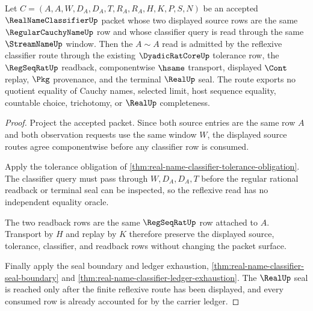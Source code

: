\begin{theorem}
\label{thm:realnameclassifier-reflexive-window}
Let $C=(A,A,W,D_A,D_A,T,R_A,R_A,H,K,P,S,N)$ be an accepted $\RealNameClassifierUp$ packet whose two displayed source rows are the same $\RegularCauchyNameUp$ row and whose classifier query is read through the same $\StreamNameUp$ window. Then the $A\sim A$ read is admitted by the reflexive classifier route through the existing $\DyadicRatCoreUp$ tolerance row, the $\RegSeqRatUp$ readback, componentwise $\hsame$ transport, displayed $\Cont$ replay, $\Pkg$ provenance, and the terminal $\RealUp$ seal. The route exports no quotient equality of Cauchy names, selected limit, host sequence equality, countable choice, trichotomy, or $\RealUp$ completeness.
\end{theorem}
\begin{proof}
Project the accepted packet. Since both source entries are the same row $A$ and both observation requests use the same window $W$, the displayed source routes agree componentwise before any classifier row is consumed.

Apply the tolerance obligation of \autoref{thm:real-name-classifier-tolerance-obligation}. The classifier query must pass through $W,D_A,D_A,T$ before the regular rational readback or terminal seal can be inspected, so the reflexive read has no independent equality oracle.

The two readback rows are the same $\RegSeqRatUp$ row attached to $A$. Transport by $H$ and replay by $K$ therefore preserve the displayed source, tolerance, classifier, and readback rows without changing the packet surface.

Finally apply the seal boundary and ledger exhaustion, \autoref{thm:real-name-classifier-seal-boundary} and \autoref{thm:real-name-classifier-ledger-exhaustion}. The $\RealUp$ seal is reached only after the finite reflexive route has been displayed, and every consumed row is already accounted for by the carrier ledger.
\end{proof}

